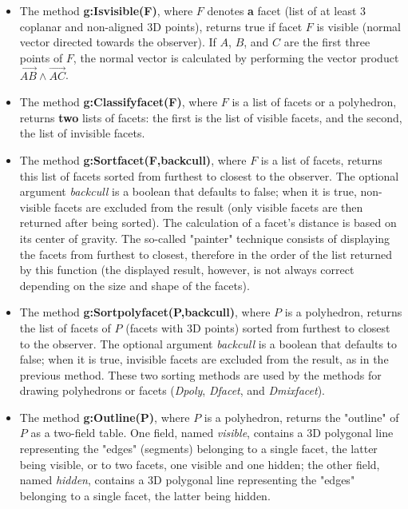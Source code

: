 \begin{itemize}
    \item The method \textbf{g:Isvisible(F)}, where $F$ denotes \textbf{a} facet (list of at least 3 coplanar and non-aligned 3D points), returns true if facet $F$ is visible (normal vector directed towards the observer). If $A$, $B$, and $C$ are the first three points of $F$, the normal vector is calculated by performing the vector product $\vec{AB}\wedge\vec{AC}$.

    \item The method \textbf{g:Classifyfacet(F)}, where $F$ is a list of facets or a polyhedron, returns \textbf{two} lists of facets: the first is the list of visible facets, and the second, the list of invisible facets.

    \item The method \textbf{g:Sortfacet(F,backcull)}, where $F$ is a list of facets, returns this list of facets sorted from furthest to closest to the observer. The optional argument \emph{backcull} is a boolean that defaults to false; when it is true, non-visible facets are excluded from the result (only visible facets are then returned after being sorted). The calculation of a facet's distance is based on its center of gravity. The so-called "painter" technique consists of displaying the facets from furthest to closest, therefore in the order of the list returned by this function (the displayed result, however, is not always correct depending on the size and shape of the facets).

    \item The method \textbf{g:Sortpolyfacet(P,backcull)}, where $P$ is a polyhedron, returns the list of facets of $P$ (facets with 3D points) sorted from furthest to closest to the observer. The optional argument \emph{backcull} is a boolean that defaults to false; when it is true, invisible facets are excluded from the result, as in the previous method. These two sorting methods are used by the methods for drawing polyhedrons or facets (\emph{Dpoly}, \emph{Dfacet}, and \emph{Dmixfacet}).

    \item The method \textbf{g:Outline(P)}, where $P$ is a polyhedron, returns the "outline" of $P$ as a two-field table. One field, named \emph{visible}, contains a 3D polygonal line representing the "edges" (segments) belonging to a single facet, the latter being visible, or to two facets, one visible and one hidden; the other field, named \emph{hidden}, contains a 3D polygonal line representing the "edges" belonging to a single facet, the latter being hidden.


\end{itemize}

